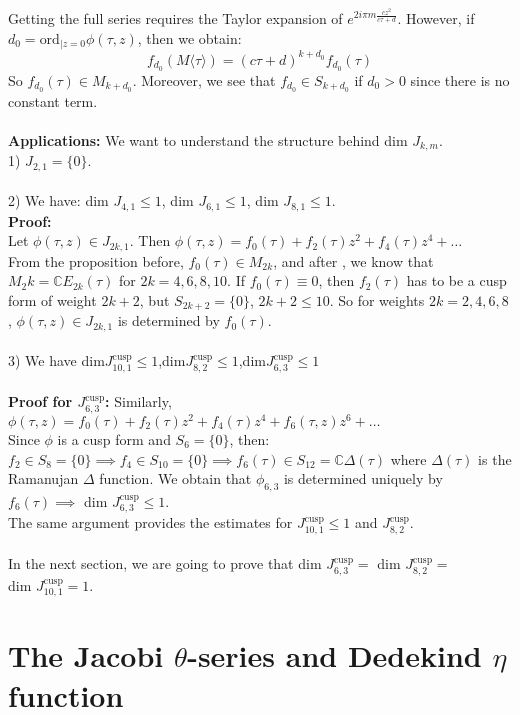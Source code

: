 \documentclass[10pt,a4paper]{article}
\begin{document}
Getting the full series requires the Taylor expansion of $e^{2i\pi m\frac{cz^2}{c\tau+d}}$. However, if $d_0=\textrm{ord}_{|z=0}\phi(\tau,z)$, then we obtain:
\[f_{d_0}(M\langle\tau\rangle)=(c\tau+d)^{k+d_0}f_{d_0}(\tau)\]
So $f_{d_0}(\tau)\in M_{k+d_0}$. Moreover, we see that $f_{d_0}\in S_{k+d_0}$ if $d_0>0$ since there is no constant term.\\
\\
\textbf{Applications: }
We want to understand the structure behind dim $J_{k,m}$.\\
1) $J_{2,1}=\{0\}$.\\
\\
2) We have: dim $J_{4,1}\leq1$, dim $J_{6,1}\leq1$, dim $J_{8,1}\leq1$.\\
\textbf{Proof:}\\
Let $\phi(\tau,z)\in J_{2k,1}$. Then $\phi(\tau,z)=f_0(\tau)+f_2(\tau)z^2+f_4(\tau)z^4+\ldots$\\ From the proposition before, $f_0(\tau)\in M_{2k}$, and after \cite{SerreCA}, we know that $M_2k=\mathbb{C}E_{2k}(\tau)$ for $2k=4,6,8,10$. If $f_0(\tau)\equiv0$, then $f_2(\tau)$ has to be a cusp form of weight $2k+2$, but $S_{2k+2}=\{0\}$, $2k+2\leq10$. So for weights $2k=2,4,6,8$, $\phi(\tau,z)\in J_{2k,1}$ is determined by $f_0(\tau)$.\\
\\
3) We have dim$J_{10,1}^{\textrm{cusp}}\leq1$,\quad dim$J_{8,2}^{\textrm{cusp}}\leq1$,\quad dim$J_{6,3}^{\textrm{cusp}}\leq1$\\
\\
\textbf{Proof for $J_{6,3}^{\textrm{cusp}}$:}
Similarly, $\phi(\tau,z)=f_0(\tau)+f_2(\tau)z^2+f_4(\tau)z^4+f_6(\tau,z)
z^6+\ldots$\\
Since $\phi$ is a cusp form and $S_6=\{0\}$, then:\\
$f_2\in S_8=\{0\}\implies f_4\in S_{10}=\{0\}\implies f_6(\tau)\in S_{12}=\mathbb{C}\Delta(\tau)$ where $\Delta(\tau)$ is the Ramanujan $\Delta$ function. We obtain that $\phi_{6,3}$ is determined uniquely by $f_6(\tau)\implies$ dim $J_{6,3}^\textrm{cusp}\leq1$.\\
The same argument provides the estimates for $J_{10,1}^\textrm{cusp}\leq1$ and $J_{8,2}^\textrm{cusp}$.\\
\\
In the next section, we are going to prove that dim $J_{6,3}^\textrm{cusp}=$ dim $J_{8,2}^\textrm{cusp}=$\\ dim $J_{10,1}^\textrm{cusp}=1$.

\section{The Jacobi $\theta$-series and Dedekind $\eta$ function}
\end{document}
